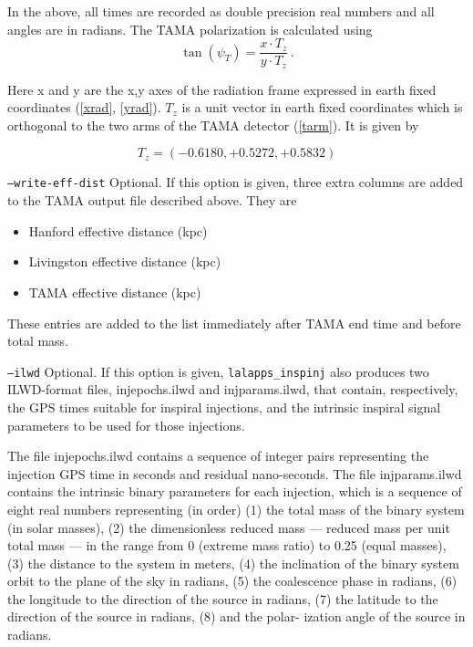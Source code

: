 \begin{entry}
\begin{entry}
In the above, all times are recorded as double precision real numbers and all
angles are in radians.  The TAMA polarization is calculated using
%
\begin{equation}
  \tan( \psi_{T} ) = \frac{ x \cdot T_{z} }{ y \cdot T_{z} } \, .
\end{equation}
%

Here x and y are the x,y axes of the radiation frame expressed in earth fixed
coordinates (\ref{xrad}, \ref{yrad}).  $T_{z}$ is a unit vector in earth fixed
coordinates which is orthogonal to the two arms of the TAMA detector
(\ref{tarm}).  It is given by

%
\begin{equation}
  T_{z} = ( -0.6180, +0.5272, +0.5832 )
\end{equation}
%

\item[\texttt{--write-eff-dist}] Optional.  If this option is given, three extra
columns are added to the TAMA output file described above.  They are
\begin{itemize}
\item Hanford effective distance (kpc)
\item Livingston effective distance (kpc)
\item TAMA effective distance (kpc)
\end{itemize}
  
These entries are added to the list immediately after TAMA end time and before
total mass.

\item[\texttt{--ilwd}] Optional. If this option is given,
\verb+lalapps_inspinj+ also produces two ILWD-format files, injepochs.ilwd and
injparams.ilwd, that contain, respectively, the  GPS  times  suitable for
inspiral injections, and the intrinsic inspiral signal parameters to be used
for  those injections.

The  file  injepochs.ilwd  contains  a sequence of integer pairs representing
the injection GPS time in  seconds  and residual  nano-seconds.   The file
injparams.ilwd contains the intrinsic binary parameters for each injection,
which is  a  sequence  of  eight  real  numbers representing (in order) (1) the
total mass of the binary system  (in  solar masses),  (2)  the  dimensionless
reduced mass --- reduced mass per unit total mass --- in the range from  0
(extreme mass  ratio)  to  0.25 (equal masses), (3) the distance to the system
in meters, (4) the inclination  of  the  binary system  orbit  to the plane of
the sky in radians, (5) the coalescence phase in radians, (6)  the  longitude
to  the direction  of  the  source in radians, (7) the latitude to the
direction of the source in radians, (8) and the polar- ization angle of the
source in radians.
\end{entry}


\end{entry}
